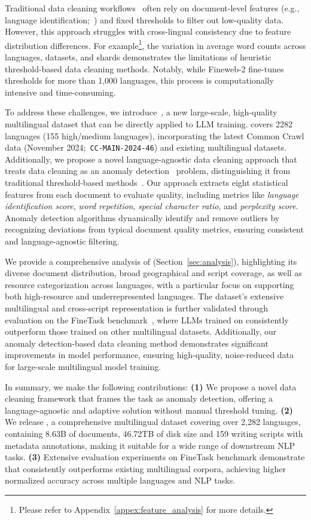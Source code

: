 Traditional data cleaning workflows~\cite{albalak2024survey} often rely on document-level features (e.g., language identification;~\citealp{kargaran-etal-2023-glotlid}) and fixed thresholds to filter out low-quality data.
However, this approach struggles with cross-lingual consistency due to feature distribution differences.
For example\footnote{Please refer to Appendix~\ref{appex:feature_analysis} for more details.}, the variation in average word counts across languages, datasets, and shards demonstrates the limitations of heuristic threshold-based data cleaning methods.
Notably, while Fineweb-2 fine-tunes thresholds for more than 1,000 languages, this process is computationally intensive and time-consuming.

To address these challenges, we introduce~\dcad, a new large-scale, high-quality multilingual dataset that can be directly applied to LLM training. \dcad covers 2282 languages (155 high/medium languages), incorporating the latest Common Crawl data (November 2024;~\texttt{CC-MAIN-2024-46}) and existing multilingual datasets.
Additionally, we propose a novel language-agnostic data cleaning approach that treats data cleaning as an anomaly detection~\cite{su2024large} problem, distinguishing it from traditional threshold-based methods~\cite{laurenccon2022bigscience,penedo2024fineweb-2}.
Our approach extracts eight statistical features from each document to evaluate quality, including metrics like \textit{language identification score}, \textit{word repetition}, \textit{special character ratio}, and \textit{perplexity score}.
Anomaly detection algorithms dynamically identify and remove outliers by recognizing deviations from typical document quality metrics, ensuring consistent and language-agnostic filtering.

We provide a comprehensive analysis of \dcad (Section~\ref{sec:analysis}), highlighting its diverse document distribution, broad geographical and script coverage, as well as resource categorization across languages, with a particular focus on supporting both high-resource and underrepresented languages.
The dataset’s extensive multilingual and cross-script representation is further validated through evaluation on the FineTask benchmark~\cite{penedo2024fineweb-2}, where LLMs trained on \dcad consistently outperform those trained on other multilingual datasets. 
Additionally, our anomaly detection-based data cleaning method demonstrates significant improvements in model performance, ensuring high-quality, noise-reduced data for large-scale multilingual model training.

In summary, we make the following contributions:  
\textbf{(1)} We propose a novel data cleaning framework that frames the task as anomaly detection, offering a language-agnostic and adaptive solution without manual threshold tuning.  
\textbf{(2)} We release \dcad, a comprehensive multilingual dataset covering over 2,282 languages, containing 8.63B of documents, 46.72TB of disk size and 159 writing scripts with metadata annotations, making it suitable for a wide range of downstream NLP tasks.
\textbf{(3)} Extensive evaluation experiments on FineTask benchmark demonstrate that \dcad consistently outperforms existing multilingual corpora, achieving higher normalized accuracy across multiple languages and NLP tasks.